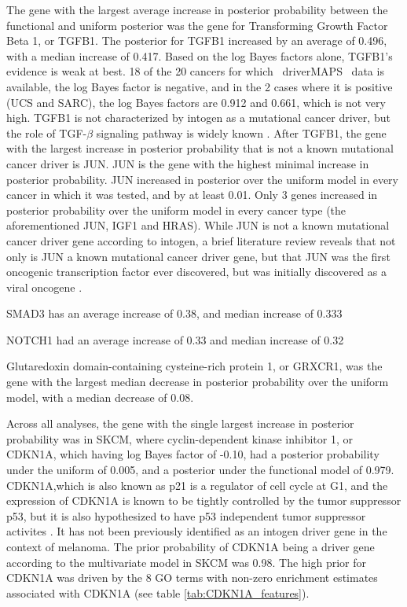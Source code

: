 The gene with the largest average increase in posterior probability between the functional and uniform posterior  was the gene for  Transforming Growth Factor Beta 1, or TGFB1.  The posterior for TGFB1 increased by an average of 0.496, with a median increase of 0.417.  Based on the log Bayes factors alone, TGFB1's evidence is weak at best.  18 of the 20 cancers for which ~driverMAPS~ data is available, the log Bayes factor is negative, and in the 2 cases where it is positive (UCS and SARC), the log Bayes factors are 0.912 and 0.661, which is not very high.  TGFB1 is not characterized by intogen as a mutational cancer driver, but the role of TGF-$\beta$ signaling pathway is widely known \cite{TGF_Zhao_2018}. After TGFB1, the gene with the largest increase in posterior probability that is not a known mutational cancer driver is JUN.  JUN is the gene with the highest minimal increase in posterior probability.  JUN increased in posterior over the uniform model in every cancer in which it was tested, and by at least 0.01.  Only 3 genes increased in posterior probability over the uniform model in every cancer type (the aforementioned JUN, IGF1 and HRAS). While JUN is not a known mutational cancer driver gene according to intogen, a brief literature review reveals that not only is JUN a known mutational cancer driver gene, but that JUN was the first oncogenic transcription factor ever discovered, but was initially discovered as a viral oncogene \cite{Vogt_2002}.  

SMAD3 has an average increase of 0.38, and median increase of 0.333

NOTCH1 had an average increase of 0.33 and median increase of 0.32





Glutaredoxin domain-containing cysteine-rich protein 1, or GRXCR1, was the gene with the largest median decrease in posterior probability over the uniform model, with a median decrease of 0.08.


Across all analyses, the gene with the single largest increase in posterior probability was in SKCM, where cyclin-dependent kinase inhibitor 1, or CDKN1A, which having log Bayes factor of -0.10, had a posterior probability under the uniform of 0.005, and a posterior under the functional model of 0.979.  CDKN1A,which is also known as p21 is a regulator of cell cycle at G1, and the expression of CDKN1A is known to be tightly controlled by the tumor suppressor p53, but it is also hypothesized to have p53 independent tumor suppressor activites \cite{abbas09_p21_cancer}.  It has not been previously identified as an intogen driver gene in the context of melanoma. The prior probability of CDKN1A being a driver gene according to the multivariate model in SKCM was 0.98.  The high prior for CDKN1A was driven by the 8 GO terms with non-zero enrichment estimates associated with CDKN1A (see table \ref{tab:CDKN1A_features}).




